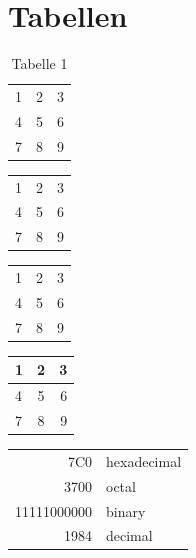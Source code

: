 \newpage

\section{Tabellen}



\begin{table}[!htb]
    \begin{tabular}{ l c r }
        1 & 2 & 3 \\
        4 & 5 & 6 \\
        7 & 8 & 9 \\
    \end{tabular}
    \caption{Tabelle 1}
    \label{first_table} %
\end{table}




\begin{tabular}{ l | c || r }
    1 & 2 & 3 \\
    4 & 5 & 6 \\
    7 & 8 & 9 \\
\end{tabular}



\begin{tabular}{ l | c || r }
    \hline
    1 & 2 & 3 \\
    4 & 5 & 6 \\
    7 & 8 & 9 \\
    \hline
\end{tabular}



\begin{center}
    \begin{tabular}{ l | c || r }
        \hline
        1 & 2 & 3 \\ \hline
        4 & 5 & 6 \\ \hline
        7 & 8 & 9 \\
        \hline
    \end{tabular}
\end{center}



\begin{tabular}{|r|l|}
    \hline
    7C0         & hexadecimal \\
    3700        & octal       \\ \cline{2-2}
    11111000000 & binary      \\
    \hline \hline
    1984        & decimal     \\
    \hline
\end{tabular}

